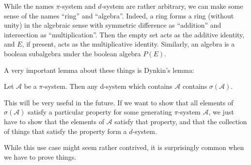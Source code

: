 \documentclass[a4paper]{article}
\begin{document}
While the names $\pi$-system and $d$-system are rather arbitrary, we can make some sense of the names ``ring'' and ``algebra''. Indeed, a ring forms a ring (without unity) in the algebraic sense with symmetric difference as ``addition'' and intersection as ``multiplication''. Then the empty set acts as the additive identity, and $E$, if present, acts as the multiplicative identity. Similarly, an algebra is a boolean subalgebra under the boolean algebra $P(E)$.

A very important lemma about these things is Dynkin's lemma:
\begin{lemma}
  Let $\mathcal{A}$ be a $\pi$-system. Then any d-system which contains $\mathcal{A}$ contains $\sigma(\mathcal{A})$.
\end{lemma}
This will be very useful in the future. If we want to show that all elements of $\sigma(\mathcal{A})$ satisfy a particular property for some generating $\pi$-system $\mathcal{A}$, we just have to show that the elements of $\mathcal{A}$ satisfy that property, and that the collection of things that satisfy the property form a $d$-system.

While this use case might seem rather contrived, it is surprisingly common when we have to prove things.
\end{document}
